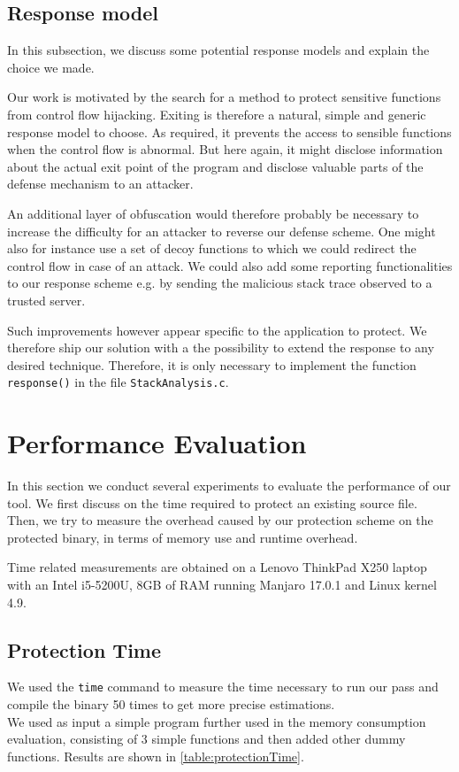\documentclass{llncs}
\begin{document}
\subsection{Response model}
In this subsection, we discuss some potential response models and explain the choice we made.

Our work is motivated by the search for a method to protect sensitive functions from control flow hijacking. Exiting is therefore a natural, simple and generic response model to choose. As required, it prevents the access to sensible functions when the control flow is abnormal. But here again, it might disclose information about the actual exit point of the program and disclose valuable parts of the defense mechanism to an attacker.

An additional layer of obfuscation would therefore probably be necessary to increase the difficulty for an attacker to reverse our defense scheme. One might also for instance use a set of decoy functions to which we could redirect the control flow in case of an attack. We could also add some reporting functionalities to our response scheme e.g. by sending the malicious stack trace observed to a trusted server.

Such improvements however appear specific to the application to protect. We therefore ship our solution with a the possibility to extend the response to any desired technique. Therefore, it is only necessary to implement the function \texttt{response()} in the file \texttt{StackAnalysis.c}.

\section{Performance Evaluation}
In this section we conduct several experiments to evaluate the performance of our tool. We first discuss on the time required to protect an existing source file.
Then, we try to measure the overhead caused by our protection scheme on the protected binary, in terms of memory use and runtime overhead.

Time related measurements are obtained on a Lenovo ThinkPad X250 laptop with an Intel i5-5200U, 8GB of RAM running Manjaro 17.0.1 and Linux kernel 4.9.

\subsection{Protection Time}
We used the \texttt{time} command to measure the time necessary to run our pass and compile the binary 50 times to get more precise estimations.\\
We used as input a simple program further used in the memory consumption evaluation, consisting of 3 simple functions and then added other dummy functions. Results are shown in \autoref{table:protectionTime}.
\end{document}
